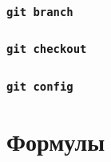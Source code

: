 \documentclass[
  letterpaper,
  DIV=11,
  numbers=noendperiod]{scrreprt}
\newcommand{\const}{\text{const}}
\newcommand{\lp}{\left(}
\newcommand{\rp}{\right)}
\newcommand{\lb}{\left[}
\newcommand{\rb}{\right]}
\newcommand*\circled[1]{\tikz[baseline=(char.base)]{
            \node[shape=circle,draw,inner sep=2pt] (char) {#1};}}
\newcommand{\xor}{\,\text{XOR}\,}
\newcommand{\setN}{\mathbb{N}}
\newcommand{\setNo}{\mathbb{N}_{0}}
\newcommand{\setZ}{\mathbb{Z}}
\newcommand{\setQ}{\mathbb{Q}}
\newcommand{\setR}{\mathbb{R}}
\newcommand{\setC}{\mathbb{C}}
\newcommand{\vm}[1]{\mathbf{#1}} %
\newcommand{\prob}{\mathbb{P}}
\newcommand{\expect}{\mathbb{E}}
\newcommand{\disp}{\mathbb{D}}
\newcommand{\var}{\mathrm{var}}
\newcommand{\cov}{\mathrm{cov}}
\newcommand{\cor}{\mathrm{cor}}
\newcommand{\se}{\mathrm{se}}
\newcommand{\sd}{\mathrm{sd}}
\newcommand{\iid}{\text{i.i.d}}
\newcommand{\Cline}[2][red]{{\sbox\MBox{$#2$}%
  \rlap{\usebox\MBox}\color{#1}\rule[-1.2\dp\MBox]{\wd\MBox}{0.5pt}}}
\newcommand{\norm}{\mathcal{N}}
\newcommand{\def}{\overset{\text{def}}{=}}
\newcommand{\sgn}{\mathrm{sgn}}
\theoremstyle{definition}
\theoremstyle{remark}
\begin{document}
\subsection{\texorpdfstring{\texttt{git\ branch}}{git branch}}\label{git-branch}

\subsection{\texorpdfstring{\texttt{git\ checkout}}{git checkout}}\label{git-checkout}

\subsection{\texorpdfstring{\texttt{git\ config}}{git config}}\label{git-config}


\chapter{Формулы}\label{formulas}

\usepackage{xcolor}
\usepackage{soul}
\usepackage{amsmath, amsfonts}

\newcommand{\const}{\text{const}}
\newcommand{\lp}{\left(}
\newcommand{\rp}{\right)}
\newcommand{\lb}{\left[}
\newcommand{\rb}{\right]}

\newcommand*\circled[1]{\tikz[baseline=(char.base)]{
            \node[shape=circle,draw,inner sep=2pt] (char) {#1};}}

\newcommand{\xor}{\,\text{XOR}\,}

\newcommand{\setN}{\mathbb{N}}
\newcommand{\setNo}{\mathbb{N}_{0}}
\newcommand{\setZ}{\mathbb{Z}}
\newcommand{\setQ}{\mathbb{Q}}
\newcommand{\setR}{\mathbb{R}}
\newcommand{\setC}{\mathbb{C}}

\newcommand{\vm}[1]{\mathbf{#1}}

\newcommand{\Falg}{\mathcal{F}}
\newcommand{\prob}{\mathbb{P}}
\newcommand{\expect}{\mathbb{E}}
\newcommand{\disp}{\mathbb{D}}
\newcommand{\var}{\text{var}}
\newcommand{\cov}{\text{cov}}
\newcommand{\cor}{\text{cor}}
\newcommand{\se}{\text{se}}
\newcommand{\sd}{\text{sd}}
\newcommand{\iid}{\text{i.i.d}}

\newsavebox{\MBox}
\newcommand{\Cline}[2][red]{{\sbox\MBox{$#2$}%
  \rlap{\usebox\MBox}\color{#1}\rule[-1.2\dp\MBox]{\wd\MBox}{0.5pt}}}

\newcommand{\norm}{\mathcal{N}}

\newcommand{\def}{\overset{\text{def}}{=}}
\newcommand{\sgn}{\text{sgn}}
\end{document}
